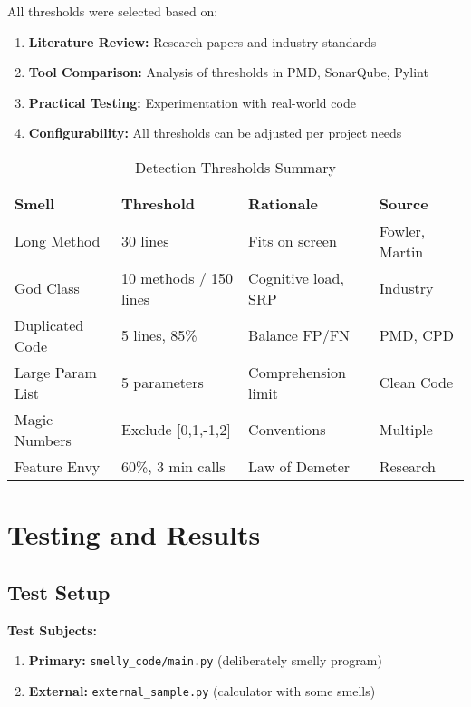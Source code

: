 \documentclass[11pt,a4paper]{article}
\begin{document}
All thresholds were selected based on:

\begin{enumerate}[noitemsep]
    \item \textbf{Literature Review:} Research papers and industry standards
    \item \textbf{Tool Comparison:} Analysis of thresholds in PMD, SonarQube, Pylint
    \item \textbf{Practical Testing:} Experimentation with real-world code
    \item \textbf{Configurability:} All thresholds can be adjusted per project needs
\end{enumerate}

\begin{table}[h]
\centering
\caption{Detection Thresholds Summary}
\begin{tabular}{@{}llp{4cm}l@{}}
\toprule
\textbf{Smell} & \textbf{Threshold} & \textbf{Rationale} & \textbf{Source} \\
\midrule
Long Method & 30 lines & Fits on screen & Fowler, Martin \\
God Class & 10 methods / 150 lines & Cognitive load, SRP & Industry \\
Duplicated Code & 5 lines, 85\% & Balance FP/FN & PMD, CPD \\
Large Param List & 5 parameters & Comprehension limit & Clean Code \\
Magic Numbers & Exclude [0,1,-1,2] & Conventions & Multiple \\
Feature Envy & 60\%, 3 min calls & Law of Demeter & Research \\
\bottomrule
\end{tabular}
\end{table}

\section{Testing and Results}

\subsection{Test Setup}

\textbf{Test Subjects:}
\begin{enumerate}[noitemsep]
    \item \textbf{Primary:} \texttt{smelly\_code/main.py} (deliberately smelly program)
    \item \textbf{External:} \texttt{external\_sample.py} (calculator with some smells)
\end{enumerate}
\end{document}
